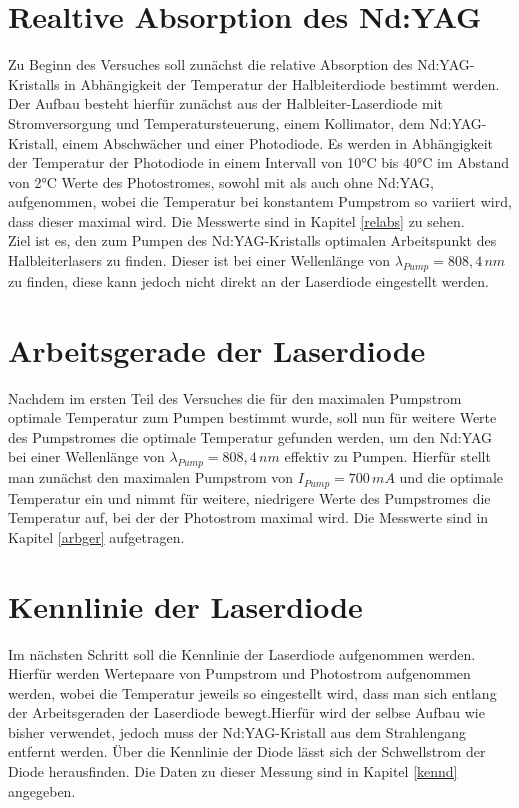 \documentclass[twoside,colorback,accentcolor=tud4c,11pt]{tudreport}
\begin{document}
\section{Realtive Absorption des Nd:YAG}\label{v1}
Zu Beginn des Versuches soll zunächst die relative Absorption des Nd:YAG-Kristalls in Abhängigkeit der Temperatur der Halbleiterdiode bestimmt werden. Der Aufbau besteht hierfür zunächst aus der Halbleiter-Laserdiode mit Stromversorgung und Temperatursteuerung, einem Kollimator, dem Nd:YAG-Kristall, einem Abschwächer und einer Photodiode. Es werden in Abhängigkeit der Temperatur der Photodiode in einem Intervall von 10°C bis 40°C im Abstand von 2°C Werte des Photostromes, sowohl mit als auch ohne Nd:YAG, aufgenommen, wobei die Temperatur bei konstantem Pumpstrom so variiert wird, dass dieser maximal wird. Die Messwerte sind in Kapitel \ref{relabs} zu sehen.\\
Ziel ist es, den zum Pumpen des Nd:YAG-Kristalls optimalen Arbeitspunkt des Halbleiterlasers zu finden. Dieser ist bei einer Wellenlänge von $\lambda_{Pump}=808,4\,\si{nm}$ zu finden, diese kann jedoch nicht direkt an der Laserdiode eingestellt werden.
\section{Arbeitsgerade der Laserdiode}\label{v2}
Nachdem im ersten Teil des Versuches die für den maximalen Pumpstrom optimale Temperatur zum Pumpen bestimmt wurde, soll nun für weitere Werte des Pumpstromes die optimale Temperatur gefunden werden, um den Nd:YAG bei einer Wellenlänge von $\lambda_{Pump}=808,4\,\si{nm}$ effektiv zu Pumpen. Hierfür stellt man zunächst den maximalen Pumpstrom von $I_{Pump}=700\,\si{mA}$ und die optimale Temperatur ein und nimmt für weitere, niedrigere Werte des Pumpstromes die Temperatur auf, bei der der Photostrom maximal wird. Die Messwerte sind in Kapitel \ref{arbger} aufgetragen.
\section{Kennlinie der Laserdiode}\label{v3}
Im nächsten Schritt soll die Kennlinie der Laserdiode aufgenommen werden. Hierfür werden Wertepaare von Pumpstrom und Photostrom aufgenommen werden, wobei die Temperatur jeweils so eingestellt wird, dass man sich entlang der Arbeitsgeraden der Laserdiode bewegt.Hierfür wird der selbse Aufbau wie bisher verwendet, jedoch muss der Nd:YAG-Kristall aus dem Strahlengang entfernt werden. Über die Kennlinie der Diode lässt sich der Schwellstrom der Diode herausfinden. Die Daten zu dieser Messung sind in Kapitel \ref{kennd} angegeben.
\end{document}
